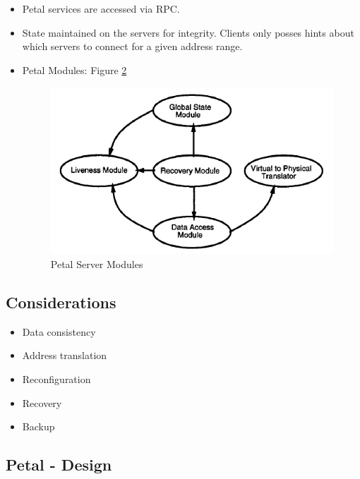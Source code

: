 \documentclass[parskip=half]{scrartcl}
\begin{document}
\begin{itemize}
\begin{figure}[ht]
            \label{fig:petal-physical-view}
        \end{figure}
        \item
        Petal services are accessed via RPC.
        \item
        State maintained on the servers for integrity. Clients only posses hints about which servers to connect for a given address range.
        \item
        Petal Modules: Figure \ref{fig:petal-server-modules}
        \begin{figure}[ht]
            \centering
            \includegraphics[width=.4\textwidth]{petal-server-modules}
            \caption{Petal Server Modules}
            \label{fig:petal-server-modules}
        \end{figure}
    \end{itemize}

    \subsection{Considerations} %
    \label{sub:considerations}
    
        \begin{itemize}
            \item 
            Data consistency
            \item 
            Address translation
            \item 
            Reconfiguration
            \item 
            Recovery
            \item 
            Backup
        \end{itemize}


    \subsection{Petal - Design} %
    \label{sub:petal_design}
\end{document}
